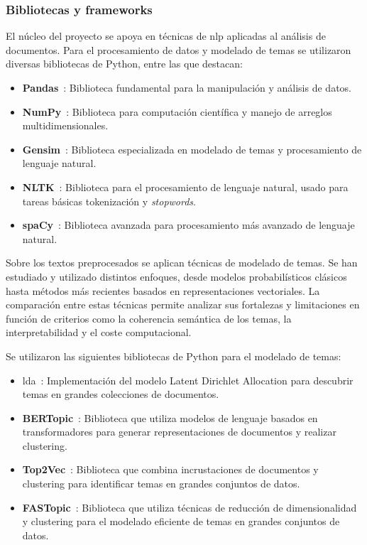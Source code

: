 \subsubsection{Bibliotecas y frameworks}

El núcleo del proyecto se apoya en técnicas de \Acrshort{nlp} aplicadas al
análisis de documentos. Para el procesamiento de datos y modelado de temas se
utilizaron diversas bibliotecas de Python, entre las que destacan:

\begin{itemize}
    \item \textbf{Pandas}~\cite{UserGuidePandas}: Biblioteca fundamental para la manipulación y análisis de datos.
    \item \textbf{NumPy}~\cite{NumPyUserGuide}: Biblioteca para computación científica y manejo de arreglos multidimensionales.
    \item \textbf{Gensim}~\cite{GensimTopicModelling}: Biblioteca especializada en modelado de temas y procesamiento de lenguaje natural.
    \item \textbf{NLTK}~\cite{NLTKNaturalLanguage}: Biblioteca para el procesamiento de lenguaje natural, usado para tareas básicas tokenización y \textit{stopwords}.
    \item \textbf{spaCy}~\cite{SpaCy101Everything}: Biblioteca avanzada para procesamiento más avanzado de lenguaje natural.
\end{itemize}

Sobre los textos preprocesados se aplican técnicas de modelado de temas. Se han
estudiado y utilizado distintos enfoques, desde modelos probabilísticos
clásicos hasta métodos más recientes basados en representaciones vectoriales.
La comparación entre estas técnicas permite analizar sus fortalezas y
limitaciones en función de criterios como la coherencia semántica de los temas,
la interpretabilidad y el coste computacional.

Se utilizaron las siguientes bibliotecas de Python para el modelado de temas:
\begin{itemize}
    \item \acrshort{lda}~\cite{LdaTopicModelingb}: Implementación del modelo Latent Dirichlet Allocation para descubrir temas en grandes colecciones de documentos.
    \item \textbf{BERTopic}~\cite{QuickStartBERTopic}: Biblioteca que utiliza modelos de lenguaje basados en transformadores para generar representaciones de documentos y realizar clustering.
    \item \textbf{Top2Vec}~\cite{angelovDdangelovTop2Vec2025a}: Biblioteca que combina incrustaciones de documentos y clustering para identificar temas en grandes conjuntos de datos.
    \item \textbf{FASTopic}~\cite{FastopicFASTopic}: Biblioteca que utiliza técnicas de reducción de dimensionalidad y clustering para el modelado eficiente de temas en grandes conjuntos de datos.
\end{itemize}

